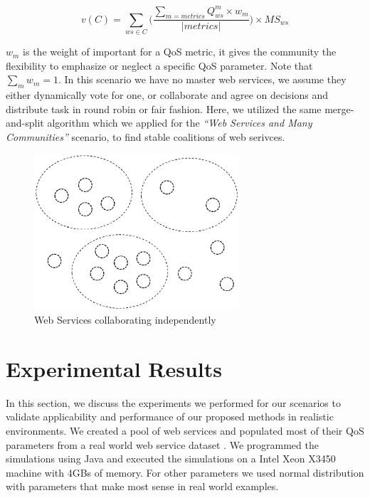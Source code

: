\documentclass[10pt, conference, compsocconf]{IEEEtran}
\theoremstyle{plain}
\theoremstyle{definition}
\begin{document}
\begin{equation}
v(C) = \sum_{ws \in C}{ \Big( \frac{\sum_{m=metrics}{Q^m_{ws} \times w_{m}}}{|metrics|} \Big) \times MS_{ws} }
\end{equation} 

$w_m$ is the weight of important for a QoS metric, it gives the community the flexibility to emphasize or neglect a specific QoS parameter. Note that $ \sum_{m}{w_m} = 1 $. In this scenario we have no master web services, we assume they either dynamically vote for one, or collaborate and agree on decisions and distribute task in round robin or fair fashion. Here, we utilized the same merge-and-split algorithm which we applied for the \emph{``Web Services and Many Communities''} scenario, to find stable coalitions of web serivces.

\begin{figure}[!t]
\centering
\includegraphics[width=3in]{s3.eps}
\caption{Web Services collaborating independently}
\label{fig_sim}
\end{figure}

\section{Experimental Results}\label{s:resutls}

In this section, we discuss the experiments we performed for our scenarios to validate applicability and performance of our proposed methods in realistic environments. We created a pool of web services and populated most of their QoS parameters from a real world web service dataset \cite{DBLP:conf/smc/Al-MasriM09a}. We programmed the simulations using Java and executed the simulations on a Intel Xeon X3450 machine with 4GBs of memory. For other parameters we used normal distribution with parameters that make most sense in real world examples.
\end{document}
